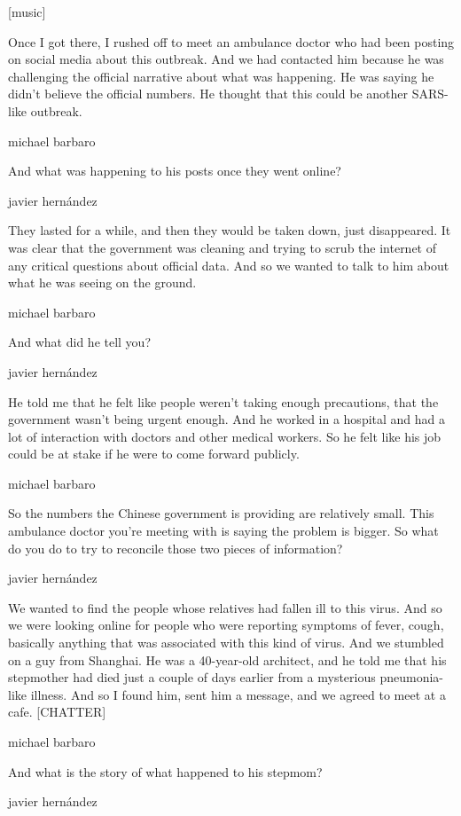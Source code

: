 {[}music{]}

Once I got there, I rushed off to meet an ambulance doctor who had been
posting on social media about this outbreak. And we had contacted him
because he was challenging the official narrative about what was
happening. He was saying he didn't believe the official numbers. He
thought that this could be another SARS-like outbreak.

michael barbaro

And what was happening to his posts once they went online?

javier hernández

They lasted for a while, and then they would be taken down, just
disappeared. It was clear that the government was cleaning and trying to
scrub the internet of any critical questions about official data. And so
we wanted to talk to him about what he was seeing on the ground.

michael barbaro

And what did he tell you?

javier hernández

He told me that he felt like people weren't taking enough precautions,
that the government wasn't being urgent enough. And he worked in a
hospital and had a lot of interaction with doctors and other medical
workers. So he felt like his job could be at stake if he were to come
forward publicly.

michael barbaro

So the numbers the Chinese government is providing are relatively small.
This ambulance doctor you're meeting with is saying the problem is
bigger. So what do you do to try to reconcile those two pieces of
information?

javier hernández

We wanted to find the people whose relatives had fallen ill to this
virus. And so we were looking online for people who were reporting
symptoms of fever, cough, basically anything that was associated with
this kind of virus. And we stumbled on a guy from Shanghai. He was a
40-year-old architect, and he told me that his stepmother had died just
a couple of days earlier from a mysterious pneumonia-like illness. And
so I found him, sent him a message, and we agreed to meet at a cafe.
{[}CHATTER{]}

michael barbaro

And what is the story of what happened to his stepmom?

javier hernández

